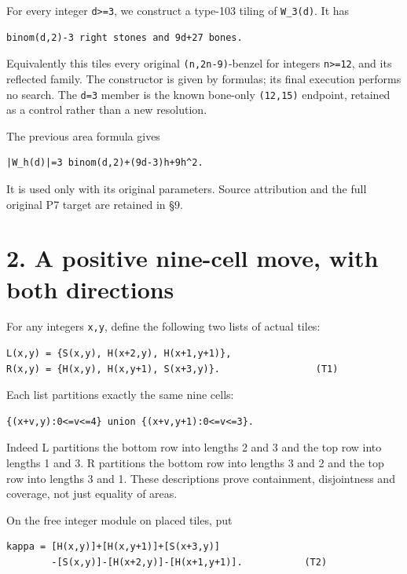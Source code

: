 \documentclass[
  10pt,
]{scrreprt}
\begin{document}
For every integer \texttt{d\textgreater{}=3}, we construct a type-103
tiling of \texttt{W\_3(d)}. It has

\begin{verbatim}
binom(d,2)-3 right stones and 9d+27 bones.
\end{verbatim}

Equivalently this tiles every original \texttt{(n,2n-9)}-benzel for
integers \texttt{n\textgreater{}=12}, and its reflected family. The
constructor is given by formulas; its final execution performs no
search. The \texttt{d=3} member is the known bone-only \texttt{(12,15)}
endpoint, retained as a control rather than a new resolution.

The previous area formula gives

\begin{verbatim}
|W_h(d)|=3 binom(d,2)+(9d-3)h+9h^2.
\end{verbatim}

It is used only with its original parameters. Source attribution and the
full original P7 target are retained in §9.

\section{2. A positive nine-cell move, with both
directions}\label{edition-5-section-2}

For any integers \texttt{x,y}, define the following two lists of actual
tiles:

\begin{verbatim}
L(x,y) = {S(x,y), H(x+2,y), H(x+1,y+1)},
R(x,y) = {H(x,y), H(x,y+1), S(x+3,y)}.                 (T1)
\end{verbatim}

Each list partitions exactly the same nine cells:

\begin{verbatim}
{(x+v,y):0<=v<=4} union {(x+v,y+1):0<=v<=3}.
\end{verbatim}

Indeed L partitions the bottom row into lengths 2 and 3 and the top row
into lengths 1 and 3. R partitions the bottom row into lengths 3 and 2
and the top row into lengths 3 and 1. These descriptions prove
containment, disjointness and coverage, not just equality of areas.

On the free integer module on placed tiles, put

\begin{verbatim}
kappa = [H(x,y)]+[H(x,y+1)]+[S(x+3,y)]
        -[S(x,y)]-[H(x+2,y)]-[H(x+1,y+1)].           (T2)
\end{verbatim}
\end{document}
